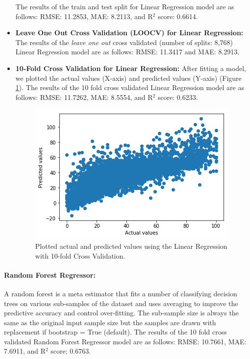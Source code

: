 \documentclass[11pt]{article}
\begin{document}
\begin{itemize}
The results of the train and test split for Linear Regression model are as follows:
RMSE:  11.2853, MAE:  8.2113, and R$^{2}$ score: 0.6614.

\item \textbf{Leave One Out Cross Validation (LOOCV) for Linear Regression:}
The results of the \textit{leave one out} cross validated (number of splits: 8,768) Linear Regression model are as follows:
RMSE:  11.3417 and MAE:  8.2913.

\item \textbf{10-Fold Cross Validation for Linear Regression:}
After fitting a model, we plotted the actual values (X-axis) and predicted values (Y-axis) (Figure \ref{fig:reg_plot_10fold}).
%
The results of the 10 fold cross validated Linear Regression model are as follows:
%
RMSE:  11.7262, MAE:  8.5554, and R$^{2}$ score:  0.6233.

\begin{figure}[h!]
\centering 
\includegraphics[scale=0.5]{reg_plot_10fold.png}
\caption{Plotted actual and predicted values using the Linear Regression with 10-fold Cross Validation.}
  \label{fig:reg_plot_10fold}
\end{figure}

\end{itemize}

\paragraph*{Random Forest Regressor:}
A random forest is a meta estimator that fits a number of classifying decision trees on various sub-samples of the dataset and uses averaging to improve the predictive accuracy and control over-fitting. The sub-sample size is always the same as the original input sample size but the samples are drawn with replacement if bootstrap = True (default).
%
The results of the 10 fold cross validated Random Forest Regressor model are as follows:
RMSE:  10.7661, MAE:  7.6911, and R$^{2}$ score:  0.6763.
\end{document}
